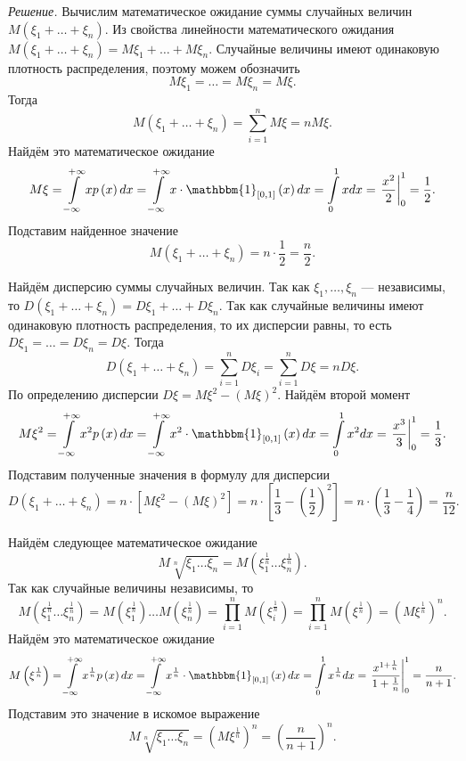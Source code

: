 \textit{Решение.} Вычислим математическое ожидание суммы случайных величин $M \left( \xi_1 + \dotsc + \xi_n \right) $.
Из свойства линейности математического ожидания $M \left( \xi_1 + \dotsc + \xi_n \right) = M \xi_1 + \dotsc + M \xi_n$.
Случайные величины имеют одинаковую плотность распределения, поэтому можем обозначить
$$M \xi_1 =
\dotsc =
M \xi_n =
M \xi.$$
Тогда
$$M \left( \xi_1 + \dotsc + \xi_n \right) =
\sum \limits_{i=1}^n M \xi =
nM \xi.$$
Найдём это математическое ожидание
$$M \xi =
\int \limits_{- \infty }^{+ \infty } xp \left( x \right) dx =
\int \limits_{- \infty }^{+ \infty } x \cdot \mathbbm{1}_{ \left[ 0, 1 \right] } \left( x \right) dx =
\int \limits_0^1 xdx =
\left. \frac{x^2}{2} \right|_0^1 =
\frac{1}{2}.$$
Подставим найденное значение
$$M \left( \xi_1 + \dotsc + \xi_n \right) =
n \cdot \frac{1}{2} =
\frac{n}{2}.$$

Найдём дисперсию суммы случайных величин.
Так как $ \xi_1, \dotsc, \xi_n$ --- независимы, то $D \left( \xi_1 + \dotsc + \xi_n \right) = D \xi_1 + \dotsc + D \xi_n$.
Так как случайные величины имеют одинаковую плотность распределения, то их дисперсии равны, то есть $D \xi_1 = \dotsc = D \xi_n = D \xi $.
Тогда
$$D \left( \xi_1 + \dotsc + \xi_n \right) =
\sum \limits_{i=1}^n D \xi_i =
\sum \limits_{i=1}^n D \xi =
nD \xi.$$
По определению дисперсии $D \xi = M \xi^2 - \left( M \xi \right)^2$.
Найдём второй момент
$$M \xi^2 =
\int \limits_{- \infty }^{+ \infty } x^2 p \left( x \right) dx =
\int \limits_{- \infty }^{+ \infty } x^2 \cdot \mathbbm{1}_{ \left[ 0, 1 \right] } \left( x \right) dx =
\int \limits_0^1 x^2 dx =
\left. \frac{x^3}{3} \right|_0^1 =
\frac{1}{3}.$$
Подставим полученные значения в формулу для дисперсии
$$D \left( \xi_1 + \dotsc + \xi_n \right) =
n \cdot \left[ M \xi^2 - \left( M \xi \right)^2 \right] =
n \cdot \left[ \frac{1}{3} - \left( \frac{1}{2} \right)^2 \right] =
n \cdot \left( \frac{1}{3} - \frac{1}{4} \right) =
\frac{n}{12}.$$

Найдём следующее математическое ожидание
$$M \sqrt[n]{ \xi_1 \dotsc \xi_n} =
M \left( \xi_1^{ \frac{1}{n}} \dotsc \xi_n^{ \frac{1}{n}} \right).$$
Так как случайные величины независимы, то
$$M \left( \xi_1^{ \frac{1}{n}} \dotsc \xi_n^{ \frac{1}{n}} \right) =
M \left( \xi_1^{ \frac{1}{n}} \right) \dotsc M \left( \xi_n^{ \frac{1}{n}} \right) =
\prod \limits_{i=1}^n M \left( \xi_i^{ \frac{1}{n}} \right) =
\prod \limits_{i=1}^n M \left( \xi^{ \frac{1}{n}} \right) =
\left( M \xi^{ \frac{1}{n}} \right)^n.$$
Найдём это математическое ожидание
$$M \left( \xi^{ \frac{1}{n}} \right) =
\int \limits_{- \infty }^{+ \infty } x^{ \frac{1}{n}} p \left( x \right) dx =
\int \limits_{- \infty }^{+ \infty } x^{ \frac{1}{n}} \cdot \mathbbm{1}_{ \left[ 0, 1 \right] } \left( x \right) dx =
\int \limits_0^1 x^{ \frac{1}{n}} dx =
\left. \frac{x^{1+ \frac{1}{n}}}{1 + \frac{1}{n}} \right|_0^1 =
\frac{n}{n+1}.$$
Подставим это значение в искомое выражение
$$M \sqrt[n]{ \xi_1 \dotsc \xi_n} =
\left( M \xi^{ \frac{1}{n}} \right)^n =
\left( \frac{n}{n+1} \right)^n.$$

